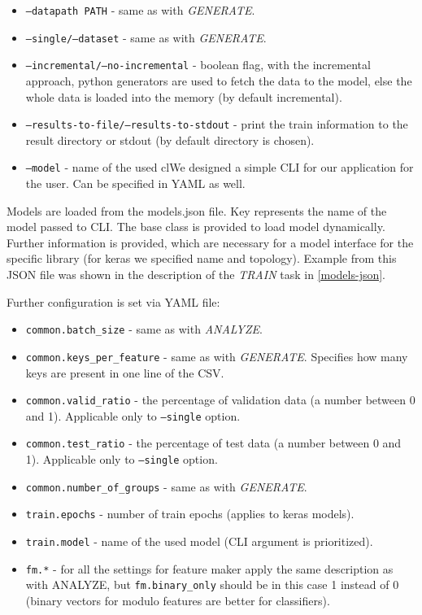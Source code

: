 \begin{itemize}

\item \texttt{--datapath PATH} - same as with \textit{GENERATE}.
\item \texttt{--single/--dataset} - same as with \textit{GENERATE}.
\item \texttt{--incremental/--no-incremental} - boolean flag, with the incremental approach, python generators are used to fetch the data to the model, else the whole data is loaded into the memory (by default incremental).
\item \texttt{--results-to-file/--results-to-stdout} - print the train information to the result directory or stdout (by default directory is chosen).
\item \texttt{--model} - name of the used clWe designed a simple CLI for our application for the user. Can be specified in YAML as well.

\end{itemize}

Models are loaded from the models.json file. Key represents the name of the model passed to CLI. The base class is provided to load model dynamically. Further information is provided, which are necessary for a model interface for the specific library (for keras we specified name and topology). Example from this JSON file was shown in the description of the \textit{TRAIN} task in \autoref{models-json}.

Further configuration is set via YAML file:

\begin{itemize}

\item \texttt{common.batch\_size} - same as with \textit{ANALYZE}.
\item \texttt{common.keys\_per\_feature} - same as with \textit{GENERATE}. Specifies how many keys are present in one line of the CSV.
\item \texttt{common.valid\_ratio} - the percentage of validation data (a number between 0 and 1). Applicable only to \texttt{--single} option.
\item \texttt{common.test\_ratio} - the percentage of test data (a number between 0 and 1). Applicable only to \texttt{--single} option.
\item \texttt{common.number\_of\_groups} - same as with \textit{GENERATE}.
\item \texttt{train.epochs} - number of train epochs (applies to keras models).
\item \texttt{train.model} - name of the used model (CLI argument is prioritized).
\item \texttt{fm.*} - for all the settings for feature maker  apply the same description as with ANALYZE, but \texttt{fm.binary\_only} should be in this case 1 instead of 0 (binary vectors for modulo features are better for classifiers).

\end{itemize}

